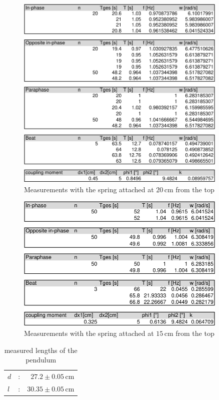 \documentclass{scrreprt}
\newcommand{\unit}[1]{\ensuremath{\, \mathrm{#1}}}
\begin{document}
\begin{figure}[H]
	\centering
  \includegraphics[width=0.9\textwidth]{diag/readings20cm.pdf}
	\caption{Measurements with the spring attached at $20\unit{cm}$ from the top}
	\label{fig:20cm}
\end{figure}

\begin{figure}[H]
	\centering
  \includegraphics[width=0.9\textwidth]{diag/readings15cm.pdf}
	\caption{Measurements with the spring attached at $15\unit{cm}$ from the top}
	\label{fig:15cm}
\end{figure}
\begin{table}[H]
	\centering
	\begin{tabular}{lcr}		
		$d$&:&$27.2\pm 0.05\unit{cm}$\\
		$l$&:&$30.35\pm 0.05\unit{cm}$\\
		\end{tabular}
	\caption{measured lengths of the pendulum}
\end{table}
\end{document}
